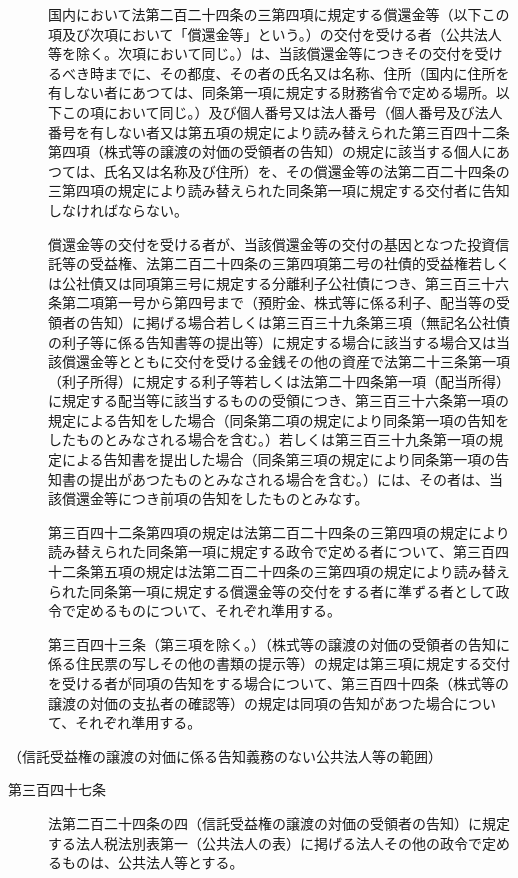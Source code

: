 \documentclass[twocolumn,a4j,10pt]{ltjtarticle}
\begin{document}
\begin{description}
\item[]国内において法第二百二十四条の三第四項に規定する償還金等（以下この項及び次項において「償還金等」という。）の交付を受ける者（公共法人等を除く。次項において同じ。）は、当該償還金等につきその交付を受けるべき時までに、その都度、その者の氏名又は名称、住所（国内に住所を有しない者にあつては、同条第一項に規定する財務省令で定める場所。以下この項において同じ。）及び個人番号又は法人番号（個人番号及び法人番号を有しない者又は第五項の規定により読み替えられた第三百四十二条第四項（株式等の譲渡の対価の受領者の告知）の規定に該当する個人にあつては、氏名又は名称及び住所）を、その償還金等の法第二百二十四条の三第四項の規定により読み替えられた同条第一項に規定する交付者に告知しなければならない。
\item[]償還金等の交付を受ける者が、当該償還金等の交付の基因となつた投資信託等の受益権、法第二百二十四条の三第四項第二号の社債的受益権若しくは公社債又は同項第三号に規定する分離利子公社債につき、第三百三十六条第二項第一号から第四号まで（預貯金、株式等に係る利子、配当等の受領者の告知）に掲げる場合若しくは第三百三十九条第三項（無記名公社債の利子等に係る告知書等の提出等）に規定する場合に該当する場合又は当該償還金等とともに交付を受ける金銭その他の資産で法第二十三条第一項（利子所得）に規定する利子等若しくは法第二十四条第一項（配当所得）に規定する配当等に該当するものの受領につき、第三百三十六条第一項の規定による告知をした場合（同条第二項の規定により同条第一項の告知をしたものとみなされる場合を含む。）若しくは第三百三十九条第一項の規定による告知書を提出した場合（同条第三項の規定により同条第一項の告知書の提出があつたものとみなされる場合を含む。）には、その者は、当該償還金等につき前項の告知をしたものとみなす。
\item[]第三百四十二条第四項の規定は法第二百二十四条の三第四項の規定により読み替えられた同条第一項に規定する政令で定める者について、第三百四十二条第五項の規定は法第二百二十四条の三第四項の規定により読み替えられた同条第一項に規定する償還金等の交付をする者に準ずる者として政令で定めるものについて、それぞれ準用する。
\item[]第三百四十三条（第三項を除く。）（株式等の譲渡の対価の受領者の告知に係る住民票の写しその他の書類の提示等）の規定は第三項に規定する交付を受ける者が同項の告知をする場合について、第三百四十四条（株式等の譲渡の対価の支払者の確認等）の規定は同項の告知があつた場合について、それぞれ準用する。
\end{description}
\noindent\hspace{10pt}（信託受益権の譲渡の対価に係る告知義務のない公共法人等の範囲）
\begin{description}
\item[第三百四十七条]法第二百二十四条の四（信託受益権の譲渡の対価の受領者の告知）に規定する法人税法別表第一（公共法人の表）に掲げる法人その他の政令で定めるものは、公共法人等とする。
\end{description}
\end{document}
